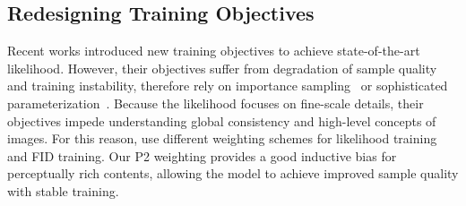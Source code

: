 \subsection{Redesigning Training Objectives}
Recent works \cite{kingma2021variational,song2021maximum,vahdat2021score} introduced new training objectives to achieve state-of-the-art likelihood. However, their objectives suffer from degradation of sample quality and training instability, therefore rely on importance sampling~\cite{song2021maximum,vahdat2021score} or sophisticated parameterization~\cite{kingma2021variational}. Because the likelihood focuses on fine-scale details, their objectives impede understanding global consistency and high-level concepts of images. For this reason, \cite{vahdat2021score} use different weighting schemes for likelihood training and FID training. Our P2 weighting provides a good inductive bias for perceptually rich contents, allowing the model to achieve improved sample quality with stable training. 



